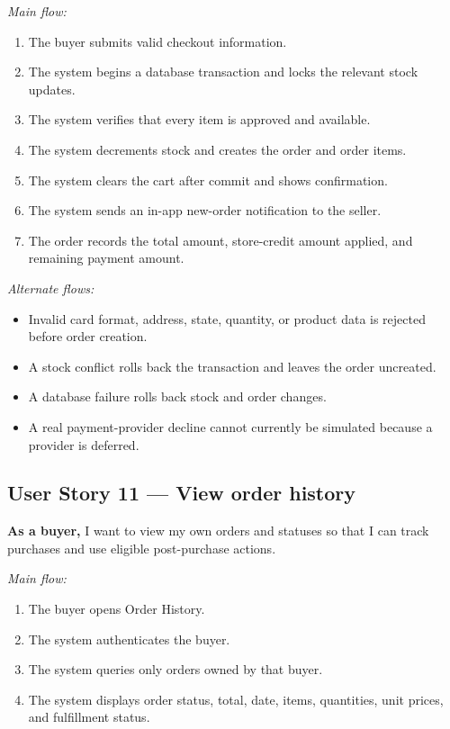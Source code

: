 \documentclass[11pt]{scrreprt}
\begin{document}
\textit{Main flow:}
\begin{enumerate}
\item The buyer submits valid checkout information.
\item The system begins a database transaction and locks the relevant stock
updates.
\item The system verifies that every item is approved and available.
\item The system decrements stock and creates the order and order items.
\item The system clears the cart after commit and shows confirmation.
\item The system sends an in-app new-order notification to the seller.
\item The order records the total amount, store-credit amount applied, and
remaining payment amount.
\end{enumerate}

\textit{Alternate flows:}
\begin{itemize}
\item Invalid card format, address, state, quantity, or product data is
rejected before order creation.
\item A stock conflict rolls back the transaction and leaves the order
uncreated.
\item A database failure rolls back stock and order changes.
\item A real payment-provider decline cannot currently be simulated because a
provider is deferred.
\end{itemize}

\subsection{User Story 11 --- View order history}
\textbf{As a buyer,} I want to view my own orders and statuses so that I can
track purchases and use eligible post-purchase actions.

\textit{Main flow:}
\begin{enumerate}
\item The buyer opens Order History.
\item The system authenticates the buyer.
\item The system queries only orders owned by that buyer.
\item The system displays order status, total, date, items, quantities, unit
prices, and fulfillment status.
\end{enumerate}
\end{document}
